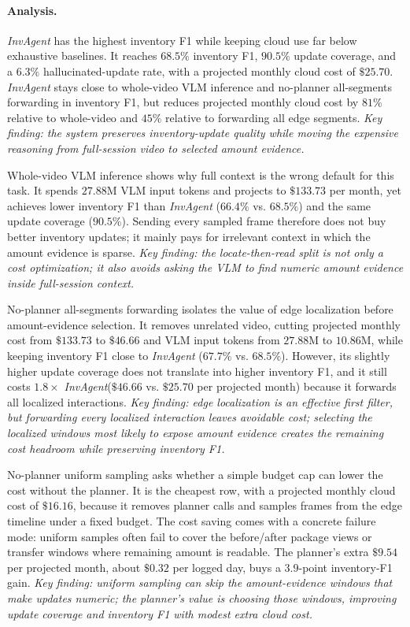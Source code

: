\documentclass[sigconf,anonymous,nonacm]{acmart}
\newcommand{\sys}{\textit{InvAgent}\xspace}
\begin{document}
\paragraph{Analysis.}
\sys has the highest inventory F1 while keeping cloud use far below
exhaustive baselines. It reaches $68.5\%$ inventory F1, $90.5\%$
update coverage, and a $6.3\%$ hallucinated-update rate, with a
projected monthly cloud cost of $\$25.70$. \sys stays close to
whole-video VLM inference and no-planner all-segments forwarding in
inventory F1, but reduces projected monthly cloud cost by $81\%$
relative to whole-video and $45\%$ relative to forwarding all edge
segments.
\emph{Key finding: the system preserves inventory-update quality while
moving the expensive reasoning from full-session video to selected
amount evidence.}

Whole-video VLM inference shows why full context is the wrong default
for this task. It spends $27.88$M VLM input tokens and projects to
$\$133.73$ per month, yet achieves lower inventory F1 than \sys
($66.4\%$ vs. $68.5\%$) and the same update coverage ($90.5\%$).
Sending every sampled frame therefore does not buy better inventory
updates; it mainly pays for irrelevant context in which the amount
evidence is sparse.
\emph{Key finding: the locate-then-read split is not only a cost
optimization; it also avoids asking the VLM to find numeric amount
evidence inside full-session context.}

No-planner all-segments forwarding isolates the value of edge
localization before amount-evidence selection. It removes unrelated
video, cutting projected monthly cost from $\$133.73$ to $\$46.66$ and
VLM input tokens from
$27.88$M to $10.86$M, while keeping inventory F1 close to \sys
($67.7\%$ vs. $68.5\%$). However, its slightly higher update coverage
does not translate into higher inventory F1, and it still costs
$1.8\times$ \sys ($\$46.66$ vs. $\$25.70$ per projected month)
because it forwards all localized interactions.
\emph{Key finding: edge localization is an effective first filter, but
forwarding every localized interaction leaves avoidable cost; selecting
the localized windows most likely to expose amount evidence creates the
remaining cost headroom while preserving inventory F1.}

No-planner uniform sampling asks whether a simple budget cap can lower the cost without the planner. It is the cheapest row, with a projected monthly cloud cost
of $\$16.16$, because it removes planner calls and samples frames from the edge timeline under a fixed
budget. The cost saving comes with a
concrete failure mode: uniform samples often fail to cover the before/after package views or transfer windows where remaining amount is readable.  The planner's extra $\$9.54$ per projected month, about $\$0.32$ per logged day, buys a $3.9$-point inventory-F1 gain. \emph{Key finding: uniform sampling can skip the amount-evidence
windows that make updates numeric; the planner's value is choosing those
windows, improving update coverage and inventory F1 with modest extra
cloud cost.}
\end{document}
